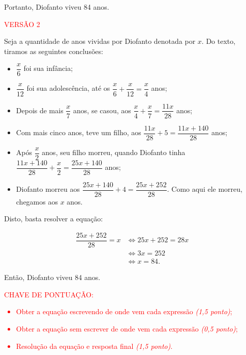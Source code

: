 Portanto, Diofanto viveu 84 anos.

\textcolor{red}{ VERSÃO 2 } %

Seja a quantidade de anos vividas por Diofanto denotada por $x$. Do texto,
tiramos as seguintes conclusões:

\begin{itemize}
    \item $\dfrac x6$ foi sua infância;
    \item $\dfrac x{12}$ foi sua adolescência, até os $\dfrac{x}6 + \dfrac{x}{12} = \dfrac{x}{4}$ anos;
    \item Depois de mais $\dfrac x7$ anos, se casou, aos $\dfrac x4 + \dfrac{x}{7} =
              \dfrac{11x}{28}$ anos;
    \item Com mais cinco anos, teve um filho, aos $\dfrac{11x}{28} + 5 =
              \dfrac{11x+140}{28}$ anos;
    \item Após $\dfrac x2$ anos, seu filho morreu, quando Diofanto tinha
          $\dfrac{11x+140}{28} + \dfrac x2 = \dfrac{25x+140}{28}$ anos;
    \item Diofanto morreu aos $\dfrac{25x+140}{28} + 4 = \dfrac{25x+252}{28}$. Como aqui
          ele morreu, chegamos aos $x$ anos.
\end{itemize}

Disto, basta resolver a equação:

\begin{align*}
    \dfrac{25x+252}{28} = x & \iff 25x+252 = 28x \\
                            & \iff 3x = 252      \\
                            & \iff x = 84.
\end{align*}

Então, Diofanto viveu 84 anos.



\bigskip

\textcolor{red}{CHAVE DE PONTUAÇÃO:
    \begin{itemize}
        \item Obter a equação escrevendo de onde vem cada expressão \emph{(1,5 ponto)};
        \item Obter a equação sem escrever de onde vem cada expressão \emph{(0,5 ponto)};
        \item Resolução da equação e resposta final \emph{(1,5 ponto)}.
    \end{itemize} }